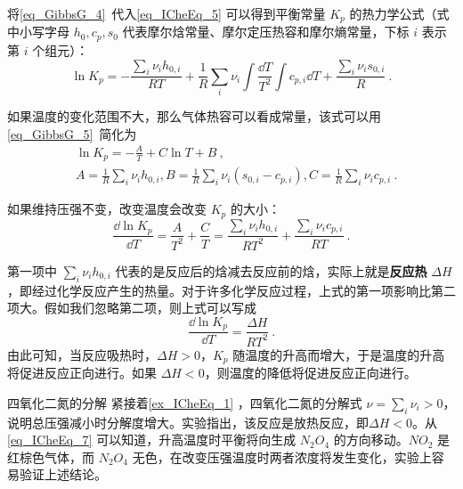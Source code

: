 将\autoref{eq_GibbsG_4}~代入\autoref{eq_ICheEq_5} 可以得到平衡常量 $K_p$ 的热力学公式（式中小写字母 $h_0,c_p,s_0$ 代表摩尔焓常量、摩尔定压热容和摩尔熵常量，下标 $i$ 表示第 $i$ 个组元）：
\begin{equation}
\ln K_p=-\frac{\sum_i \nu_i h_{0,i}}{RT}+\frac{1}{R}\sum_i\nu_i\int \frac{\dd T}{T^2}\int c_{p,i}\dd T + \frac{\sum_i \nu_i s_{0,i}}{R}~.
\end{equation}

如果温度的变化范围不大，那么气体热容可以看成常量，该式可以用\autoref{eq_GibbsG_5}~简化为
\begin{equation}
\begin{aligned}
&\ln K_p=-\frac{A}{T}+C\ln T+B~,\\
&A=\frac{1}{R} \sum_i \nu_i h_{0,i},B=\frac{1}{R}\sum_i \nu_i(s_{0,i}-c_{p,i}),C=\frac{1}{R}\sum_i \nu_ic_{p,i}~.
\end{aligned}
\end{equation}

如果维持压强不变，改变温度会改变 $K_p$ 的大小：
\begin{equation}
\frac{\dd \ln K_p}{\dd T}=\frac{A}{T^2}+\frac{C}{T}=\frac{\sum_i\nu_ih_{0,i}}{RT^2}+\frac{\sum_i\nu_ic_{p,i}}{RT}~.
\end{equation}

第一项中 $\sum_i \nu_i h_{0,i}$ 代表的是反应后的焓减去反应前的焓，实际上就是\textbf{反应热} $\Delta H$，即经过化学反应产生的热量。对于许多化学反应过程，上式的第一项影响比第二项大。假如我们忽略第二项，则上式可以写成
\begin{equation}\label{eq_ICheEq_7}
\frac{\dd \ln K_p}{\dd T}=\frac{\Delta H}{RT^2}~.
\end{equation}
由此可知，当反应吸热时，$\Delta H>0$，$K_p$ 随温度的升高而增大，于是温度的升高将促进反应正向进行。如果 $\Delta H<0$，则温度的降低将促进反应正向进行。
\begin{example}{四氧化二氮的分解}
紧接着\autoref{ex_ICheEq_1} ，四氧化二氮的分解式 $\nu=\sum_i\nu_i>0$，说明总压强减小时分解度增大。实验指出，该反应是放热反应，即$\Delta H<0$。从\autoref{eq_ICheEq_7} 可以知道，升高温度时平衡将向生成 $N_2O_4$ 的方向移动。$NO_2$ 是红棕色气体，而 $N_2O_4$ 无色，在改变压强温度时两者浓度将发生变化，实验上容易验证上述结论。 
\end{example}
